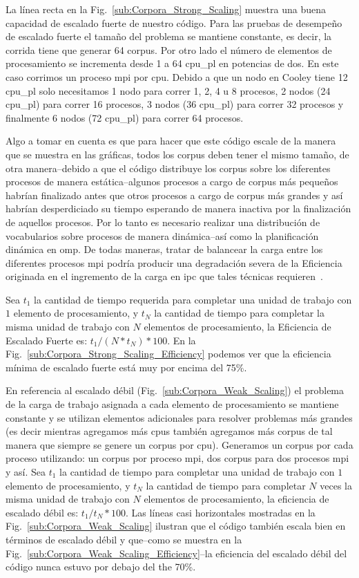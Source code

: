 {La línea recta en la Fig.~\ref{sub:Corpora_Strong_Scaling} muestra una buena capacidad de escalado fuerte de nuestro código.
Para las pruebas de desempeño de escalado fuerte el tamaño del problema se mantiene constante, es decir, la corrida tiene que generar 64 corpus.
Por otro lado el número de elementos de procesamiento se incrementa desde 1 a 64 \gls{cpu_pl} en potencias de dos.
En este caso corrimos un proceso \gls{mpi} por \gls{cpu}.
Debido a que un nodo en Cooley tiene 12 \gls{cpu_pl} solo necesitamos 1 nodo para correr 1, 2, 4 u 8 procesos, 2 nodos (24 \gls{cpu_pl}) para correr 16 procesos, 3 nodos (36 \gls{cpu_pl}) para correr 32 procesos y finalmente 6 nodos (72 \gls{cpu_pl}) para correr 64 procesos.

Algo a tomar en cuenta es que para hacer que este código escale de la manera que se muestra en las gráficas, todos los corpus deben tener el mismo tamaño, de otra manera--debido a que el código distribuye los corpus sobre los diferentes procesos de manera estática--algunos procesos a cargo de corpus más pequeños habrían finalizado antes que otros procesos a cargo de corpus más grandes y así habrían desperdiciado su tiempo esperando de manera inactiva por la finalización de aquellos procesos.
Por lo tanto es necesario realizar una distribución de vocabularios sobre procesos de manera dinámica--así como la planificación dinámica en \gls{omp}.
De todas maneras, tratar de balancear la carga entre los diferentes procesos \gls{mpi} podría producir una degradación severa de la Eficiencia originada en el ingremento de la carga en \gls{ipc} que tales técnicas requieren~\cite{hu2012biophysically}.

Sea $t_1$ la cantidad de tiempo requerida para completar una unidad de trabajo con $1$ elemento de procesamiento, y $t_N$ la cantidad de tiempo para completar la misma unidad de trabajo con $N$ elementos de procesamiento, la Eficiencia de Escalado Fuerte es: $t_1 / (N * t_N) * 100$. En la Fig.~\ref{sub:Corpora_Strong_Scaling_Efficiency} podemos ver que la eficiencia mínima de escalado fuerte está muy por encima del 75\%.

En referencia al escalado débil (Fig.~\ref{sub:Corpora_Weak_Scaling}) el problema de la carga de trabajo asignada a cada elemento de procesamiento se mantiene constante y se utilizan elementos adicionales para resolver problemas más grandes (es decir mientras agregamos más \glspl{cpu} también agregamos más corpus de tal manera que siempre se genere un corpus por \gls{cpu}).
Generamos un corpus por cada proceso utilizando: un corpus por proceso \gls{mpi}, dos corpus para dos procesos \gls{mpi} y así.
Sea $t_1$ la cantidad de tiempo para completar una unidad de trabajo con $1$ elemento de procesamiento, y $t_N$ la cantidad de tiempo para completar $N$ veces la misma unidad de trabajo con $N$ elementos de procesamiento, la eficiencia de escalado débil es: $t_1 / t_N * 100$. Las líneas casi horizontales mostradas en la Fig.~\ref{sub:Corpora_Weak_Scaling} ilustran que el código también escala bien en términos de escalado débil y que--como se muestra en la Fig.~\ref{sub:Corpora_Weak_Scaling_Efficiency}--la eficiencia del escalado débil del código nunca estuvo por debajo del the 70\%.
}{
}
